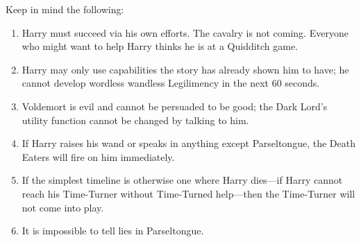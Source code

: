 Keep in mind the following:
\begin{enumerate}
\item Harry must succeed via his own efforts. The cavalry is not coming.
Everyone who might want to help Harry thinks he is at a Quidditch game.
\item Harry may only use capabilities the story has already shown him to
have; he cannot develop wordless wandless Legilimency in the next 60 seconds.
\item Voldemort is evil and cannot be persuaded to be good; the Dark Lord’s utility function cannot be changed by talking to him.
\item If Harry raises his wand or speaks in anything except Parseltongue, the Death Eaters will fire on him immediately.
\item If the simplest timeline is otherwise one where Harry dies—if Harry cannot reach his Time-Turner without Time-Turned help—then the Time-Turner will not come into play.
\item It is impossible to tell lies in Parseltongue.
\end{enumerate}
